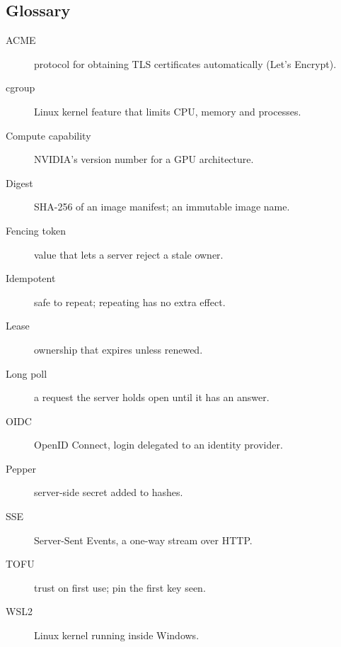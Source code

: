 \subsection{Glossary}

\begin{description}
\item[ACME] protocol for obtaining TLS certificates automatically (Let's Encrypt).
\item[cgroup] Linux kernel feature that limits CPU, memory and processes.
\item[Compute capability] NVIDIA's version number for a GPU architecture.
\item[Digest] SHA-256 of an image manifest; an immutable image name.
\item[Fencing token] value that lets a server reject a stale owner.
\item[Idempotent] safe to repeat; repeating has no extra effect.
\item[Lease] ownership that expires unless renewed.
\item[Long poll] a request the server holds open until it has an answer.
\item[OIDC] OpenID Connect, login delegated to an identity provider.
\item[Pepper] server-side secret added to hashes.
\item[SSE] Server-Sent Events, a one-way stream over HTTP.
\item[TOFU] trust on first use; pin the first key seen.
\item[WSL2] Linux kernel running inside Windows.
\end{description}
